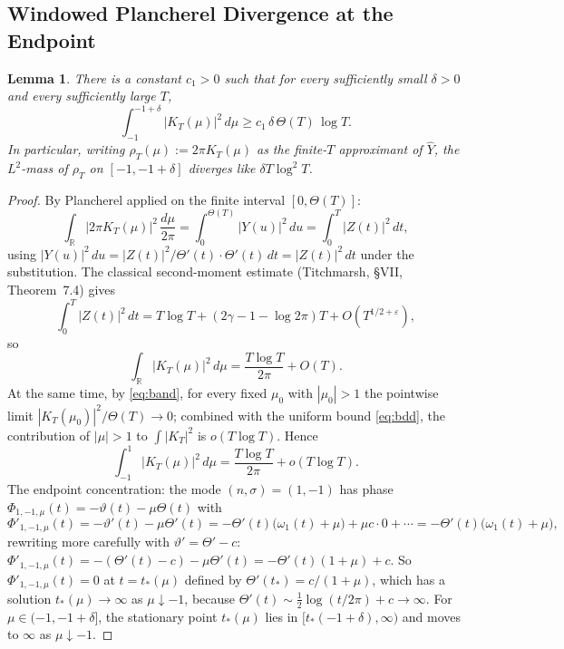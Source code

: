 \documentclass[11pt,a4paper]{article}
\theoremstyle{plain}
\newtheorem{lemma}[theorem]{Lemma}
\theoremstyle{definition}
\newcommand{\R}{\mathbb{R}}
\begin{document}
\subsection{Windowed Plancherel Divergence at the Endpoint}

\begin{lemma}\label{lem:plancherel}
There is a constant $c_1>0$ such that for every sufficiently small $\delta>0$ and every sufficiently large $T$,
\[
\int_{-1}^{-1+\delta}|K_T(\mu)|^2\,d\mu\ge c_1\,\delta\,\Theta(T)\,\log T.
\]
In particular, writing $\rho_T(\mu):=2\pi K_T(\mu)$ as the finite-$T$ approximant of $\hat Y$, the $L^2$-mass of $\rho_T$ on $[-1,-1+\delta]$ diverges like $\delta T\log^2 T$.
\end{lemma}

\begin{proof}
By Plancherel applied on the finite interval $[0,\Theta(T)]$:
\[
\int_\R|2\pi K_T(\mu)|^2\,\frac{d\mu}{2\pi}=\int_0^{\Theta(T)}|Y(u)|^2\,du=\int_0^T|Z(t)|^2\,dt,
\]
using $|Y(u)|^2\,du=|Z(t)|^2/\Theta'(t)\cdot\Theta'(t)\,dt=|Z(t)|^2\,dt$ under the substitution. The classical second-moment estimate (Titchmarsh, \S VII, Theorem~7.4) gives
\[
\int_0^T|Z(t)|^2\,dt=T\log T+(2\gamma-1-\log 2\pi)T+O(T^{1/2+\varepsilon}),
\]
so
\[
\int_\R|K_T(\mu)|^2\,d\mu=\frac{T\log T}{2\pi}+O(T).
\]
At the same time, by \eqref{eq:band}, for every fixed $\mu_0$ with $|\mu_0|>1$ the pointwise limit $|K_T(\mu_0)|^2/\Theta(T)\to 0$; combined with the uniform bound \eqref{eq:bdd}, the contribution of $|\mu|>1$ to $\int|K_T|^2$ is $o(T\log T)$. Hence
\[
\int_{-1}^{1}|K_T(\mu)|^2\,d\mu=\frac{T\log T}{2\pi}+o(T\log T).
\]
The endpoint concentration: the mode $(n,\sigma)=(1,-1)$ has phase $\Phi_{1,-1,\mu}(t)=-\vartheta(t)-\mu\Theta(t)$ with
\[
\Phi'_{1,-1,\mu}(t)=-\vartheta'(t)-\mu\Theta'(t)=-\Theta'(t)\big(\omega_1(t)+\mu\big)+\mu c\cdot 0+\cdots=-\Theta'(t)\big(\omega_1(t)+\mu\big),
\]
rewriting more carefully with $\vartheta'=\Theta'-c$: $\Phi'_{1,-1,\mu}(t)=-(\Theta'(t)-c)-\mu\Theta'(t)=-\Theta'(t)(1+\mu)+c$. So $\Phi'_{1,-1,\mu}(t)=0$ at $t=t_*(\mu)$ defined by $\Theta'(t_*)=c/(1+\mu)$, which has a solution $t_*(\mu)\to\infty$ as $\mu\downarrow-1$, because $\Theta'(t)\sim\tfrac12\log(t/2\pi)+c\to\infty$. For $\mu\in(-1,-1+\delta]$, the stationary point $t_*(\mu)$ lies in $[t_*(-1+\delta),\infty)$ and moves to $\infty$ as $\mu\downarrow-1$.


\end{proof}
\end{document}
